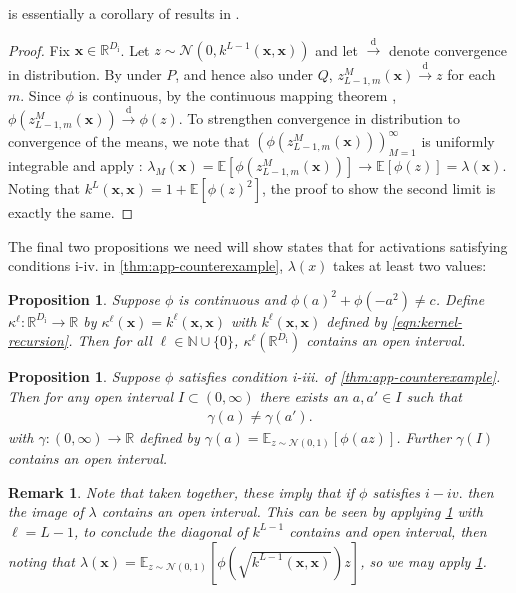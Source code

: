 \documentclass[twoside]{article}
\renewcommand{\ss}[1]{_{\text{#1}}}
\newcommand{\vx}{\mathbf{x}}
\newcommand{\E}{\mathbb{E}}
\renewcommand{\P}{\mathbb{P}}
\newcommand{\Q}{\mathbb{Q}}
\renewcommand{\Q}{\ensuremath{Q}}
\renewcommand{\P}{\ensuremath{P}}
\newcommand{\R}{\mathbb{R}}
\newcommand{\oto}[1]{\overset{#1}{\to}}
\newcommand{\distto}{\oto{\text{d}}}
\newcommand{\Normal}{\mathcal{N}}
\renewcommand{\ss}[1]{_{\text{#1}}}        %
\theoremstyle{theoremstyle}
\newtheorem{proposition}[theorem]{Proposition}
\newtheorem{remark}[theorem]{Remark}
\begin{document}
 is essentially a corollary of results in \citet{matthews_2018}.

\begin{proof}
    Fix $\vx\in \R^{D\ss{i}}$.
    Let $z \sim \Normal(0, k^{L-1}(\vx,\vx))$ and let $\distto$ denote convergence in distribution.
    By \citet[Theorem 4]{matthews_2018} under $\P$, and hence also under $\Q$, $z_{L-1,m}^M(\vx) \distto z$ for each $m$.
    Since $\phi$ is continuous, by the continuous mapping theorem \citep[Theorem 25.7]{billingsley2008probability}, $\phi(z_{L-1,m}^M(\vx)) \distto \phi(z)$.
    To strengthen convergence in distribution to convergence of the means, we note that $(\phi(z_{L-1, m}^M(\vx)))_{M=1}^\infty$ is uniformly integrable \citep[Lemma 21 by][]{matthews_2018} and apply \citet[Theorem 25.12]{billingsley2008probability}:
    $\lambda_{M}(\vx) = \E[\phi(z_{L-1,m}^M(\vx))] \to \E[\phi(z)] = \lambda(\vx)$.
    Noting that $k^{L}(\vx,\vx) = 1 + \E[\phi(z)^2]$, the proof to show the second limit is exactly the same.
\end{proof}

The final two propositions we need will show states that for activations satisfying conditions i-iv. in \cref{thm:app-counterexample}, $\lambda(x)$ takes at least two values:
\begin{proposition}\label{prop:kernel-diagonal}
Suppose $\phi$ is continuous and $\phi(a)^2+\phi(-a^2) \neq c$. Define $\kappa^{\ell}: \R^{D\ss{i}} \to \R$ by $\kappa^{\ell}(\vx) = k^{\ell}(\vx,\vx)$ with $k^{\ell}(\vx,\vx)$ defined by  \cref{eqn:kernel-recursion}. Then for all $\ell \in \mathbb{N} \cup \{0\}$, $\kappa^{\ell}(\R^{D\ss{i}})$ contains an open interval.
\end{proposition}

\begin{proposition}\label{lem:odd-fn1}
 Suppose $\phi$ satisfies condition i-iii. of \cref{thm:app-counterexample}. Then for any open interval $I \subset (0, \infty)$ there exists an $a,a' \in I$ such that
\begin{align}
    \gamma(a) \neq \gamma(a').
\end{align}
with $\gamma: (0,\infty) \to \R$ defined by $\gamma(a) = \E_{z\sim \Normal(0,1)}[\phi(az)]$.
Further $\gamma(I)$ contains an open interval.
\end{proposition}
\begin{remark}\label{rem:combining-props}
Note that taken together, these imply that if $\phi$ satisfies $i-iv.$ then the image of $\lambda$ contains an open interval. This can be seen by applying \cref{prop:kernel-diagonal} with $\ell = L-1$, to conclude the diagonal of $k^{L-1}$ contains and open interval, then noting that $\lambda(\vx) = \E_{z\sim \Normal(0,1)}[\phi(\sqrt{k^{L-1}(\vx,\vx)})z]$, so we may apply \cref{lem:odd-fn1}.
\end{remark}
\end{document}
